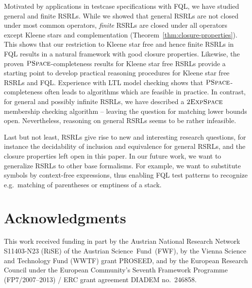 \documentclass[envcountsame]{llncs}
\newcommand{\PSPACE}{\complexityclass{PSpace}}
\newcommand{\tEXPSPACE}{\complexityclass{2ExpSpace}}
\newcommand{\complexityclass}[1]{\ensuremath{\textsc{#1}}\xspace}
\newcommand{\RegularlyGeneratedLanguageSetsAbbrev}{RSRLs\xspace}
\newcommand{\FQL}{FQL\xspace}
\begin{document}
Motivated by applications in testcase specifications with FQL, we have
studied general and finite
\RegularlyGeneratedLanguageSetsAbbrev. While we showed that general
\RegularlyGeneratedLanguageSetsAbbrev are not closed under most common
operators, \emph{finite} \RegularlyGeneratedLanguageSetsAbbrev are
closed under all operators except Kleene stars and complementation
(Theorem~\ref{thm:closure-properties}).
This shows that our restriction to Kleene star free and hence finite
\RegularlyGeneratedLanguageSetsAbbrev in \FQL results in a natural
framework with good closure properties.
Likewise, the proven \PSPACE-completeness results for Kleene star free
\RegularlyGeneratedLanguageSetsAbbrev provide a starting point to
develop practical reasoning procedures for Kleene star free
\RegularlyGeneratedLanguageSetsAbbrev and \FQL.
Experience with LTL model checking shows that \PSPACE-completeness
often leads to algorithms which are feasible in practice.
In contrast, for general and possibly infinite
\RegularlyGeneratedLanguageSetsAbbrev, we have described a \tEXPSPACE
membership checking algorithm -- leaving the question for matching
lower bounds open.
Nevertheless, reasoning on general
\RegularlyGeneratedLanguageSetsAbbrev seems to be rather infeasible.



Last but not least, \RegularlyGeneratedLanguageSetsAbbrev give rise to new
and interesting research questions, for instance 
the decidability of inclusion and equivalence for general
\RegularlyGeneratedLanguageSetsAbbrev, and the closure properties left open in this paper.
In our future work, we want to generalize
\RegularlyGeneratedLanguageSetsAbbrev to other base formalisms.
For example, we want  to substitute symbols by context-free
expressions, thus enabling \FQL test patterns to recognize
e.g.~matching of parentheses or emptiness of a stack.  



 
\section*{Acknowledgments}
This work received funding in part by the Austrian National Research
Network S11403-N23 (RiSE) of the Austrian Science~Fund~(FWF), by the
Vienna Science and Technology Fund (WWTF) grant PROSEED, and by the
European Research Council under the European Community's Seventh
Framework Programme (FP7/2007--2013) / ERC grant agreement DIADEM
no.~246858.
\end{document}
